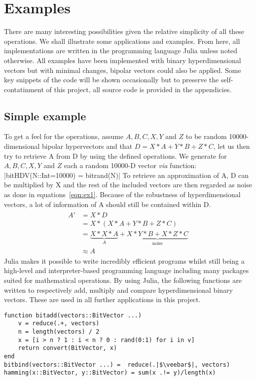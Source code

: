\section{Examples}
There are many interesting possibilities given the relative simplicity of all these operations. We shall illustrate some applications and examples. From here, all implementations are written in the programming language Julia unless noted otherwise. All examples have been implemented with binary hyperdimensional vectors but with minimal changes, bipolar vectors could also be applied. Some key snippets of the code will be shown occasionally but to preserve the self-contatinment of this project, all source code is provided in the appendicies.
\subsection{Simple example}
To get a feel for the operations, assume $A, B, C, X, Y$ and $Z$ to be random 10000-dimensional bipolar hypervectors and that $D = X*A + Y*B + Z*C$, let us then try to retrieve A from D by using the defined operations. We generate for $A, B, C, X, Y$ and $Z$ each a random 10000-D vector \textit{via} function:
|bitHDV(N::Int=10000) = bitrand(N)|
To retrieve an approximation of A, D can be multiplied by X and the rest of the included vectors are then regarded as noise as done in equations~\ref{eqn:ex1}. Because of the robustness of hyperdimensional vectors, a lot of information of A should still be contained within D.
\begin{align}\label{eqn:ex1}
\begin{split}
    A' &= X * D \\
    &= X * (X * A + Y * B + Z * C) \\
    &= \underbrace{X * X * A}_A + \underbrace{X * Y * B + X * Z * C}_\text{noise} \\
    &\approx A
\end{split}
\end{align}
Julia makes it possible to write incredibly efficient programs whilst still being a high-level and interpreter-based programming language including many packages suited for mathematical operations. By using Julia, the following functions are written to respectively add, multiply and compare hyperdimensional binary vectors. These are used in all further applications in this project.
\begin{verbatim}
function bitadd(vectors::BitVector ...)
    v = reduce(.+, vectors)
    n = length(vectors) / 2
    x = [i > n ? 1 : i < n ? 0 : rand(0:1) for i in v]
    return convert(BitVector, x)
end
bitbind(vectors::BitVector ...) =  reduce(.|$\veebar$|, vectors)
hamming(x::BitVector, y::BitVector) = sum(x .!= y)/length(x)
\end{verbatim}
